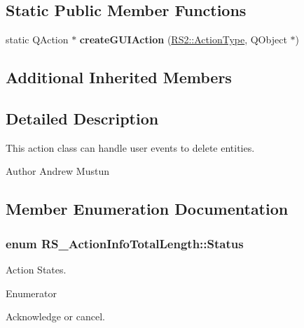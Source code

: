 \subsection*{Static Public Member Functions}
\begin{DoxyCompactItemize}
\item 
\hypertarget{classRS__ActionInfoTotalLength_a8408be2200f623dfbfa1c034c39e73c6}{static Q\-Action $\ast$ {\bfseries create\-G\-U\-I\-Action} (\hyperlink{classRS2_afe3523e0bc41fd637b892321cfc4b9d7}{R\-S2\-::\-Action\-Type}, Q\-Object $\ast$)}\label{classRS__ActionInfoTotalLength_a8408be2200f623dfbfa1c034c39e73c6}

\end{DoxyCompactItemize}
\subsection*{Additional Inherited Members}


\subsection{Detailed Description}
This action class can handle user events to delete entities.

\begin{DoxyAuthor}{Author}
Andrew Mustun 
\end{DoxyAuthor}


\subsection{Member Enumeration Documentation}
\hypertarget{classRS__ActionInfoTotalLength_aa34386c6cb3d850a1ab310ec4dcc1275}{
\subsubsection[{Status}]{\setlength{\rightskip}{0pt plus 5cm}enum {\bf R\-S\-\_\-\-Action\-Info\-Total\-Length\-::\-Status}}}\label{classRS__ActionInfoTotalLength_aa34386c6cb3d850a1ab310ec4dcc1275}
Action States. \begin{Desc}
\item[Enumerator]\par
\begin{description}
\item[{\em 
\hypertarget{classRS__ActionInfoTotalLength_aa34386c6cb3d850a1ab310ec4dcc1275aaf3426e4de66fa5dba77f698044a6005}{Acknowledge}\label{classRS__ActionInfoTotalLength_aa34386c6cb3d850a1ab310ec4dcc1275aaf3426e4de66fa5dba77f698044a6005}
}]Acknowledge or cancel. \end{description}
\end{Desc}


